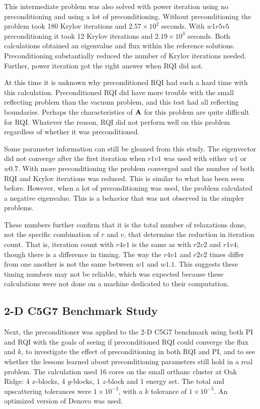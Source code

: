 This intermediate problem was also solved with power iteration using no preconditioning and using a lot of preconditioning. Without preconditioning the problem took 180 Krylov iterations and $2.57 \times 10^{2}$ seconds. With $w1r5v5$ preconditioning it took 12 Krylov iterations and $2.19 \times 10^{3}$ seconds. Both calculations obtained an eigenvalue and flux within the reference solutions. Preconditioning substantially reduced the number of Krylov iterations needed. Further, power iteration got the right answer when RQI did not. 

At this time it is unknown why preconditioned RQI had such a hard time with this calculation. Preconditioned RQI did have more trouble with the small reflecting problem than the vacuum problem, and this test had all reflecting boundaries. Perhaps the characteristics of $\mathbf{A}$ for this problem are quite difficult for RQI. Whatever the reason, RQI did not perform well on this problem regardless of whether it was preconditioned.  

Some parameter information can still be gleaned from this study. The eigenvector did not converge after the first iteration when $r1v1$ was used with either $w1$ or $w0.7$. With more preconditioning the problem converged and the number of both RQI and Krylov iterations was reduced. This is similar to what has been seen before. However, when a lot of preconditioning was used, the problem calculated a negative eigenvalue. This is a behavior that was not observed in the simpler problems. 

These numbers further confirm that it is the total number of relaxations done, not the specific combination of $r$ and $v$, that determine the reduction in iteration count. That is, iteration count with $r4v1$ is the same as with $r2v2$ and $r1v4$; though there is a difference in timing. The way the $r4v1$ and $r2v2$ times differ from one another is not the same between $w1$ and $w1.1$. This suggests these timing numbers may not be reliable, which was expected because these calculations were not done on a machine dedicated to their computation.

\subsection{2-D C5G7 Benchmark Study}
Next, the preconditioner was applied to the 2-D C5G7 benchmark using both PI and RQI with the goals of seeing if preconditioned RQI could converge the flux and $k$, to investigate the effect of preconditioning in both RQI and PI, and to see whether the lessons learned about preconditioning parameters still hold in a real problem. The calculation used 16 cores on the small orthanc cluster at Oak Ridge: 4 $x$-blocks, 4 $y$-blocks, 1 $z$-block and 1 energy set. The total and upscattering tolerances were $1 \times 10^{-3}$, with a $k$ tolerance of $1 \times 10^{-5}$. An optimized version of Denovo was used.  

